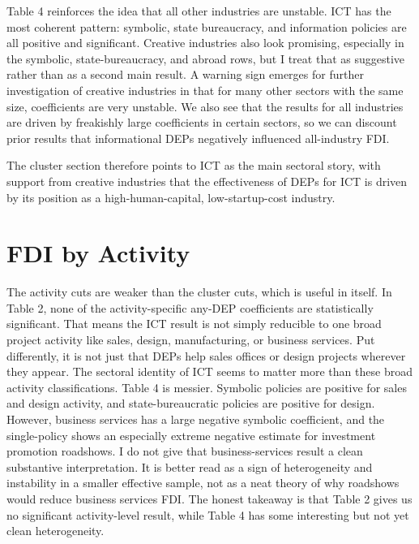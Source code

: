 \documentclass[doublespace,nopageskip]{UVAthesis}
\begin{document}
Table 4 reinforces the idea that all other industries are unstable. ICT has the most coherent pattern: symbolic, state bureaucracy, and information policies are all positive and significant. Creative industries also look promising, especially in the symbolic, state-bureaucracy, and abroad rows, but I treat that as suggestive rather than as a second main result. A warning sign emerges for further investigation of creative industries in that for many other sectors with the same size, coefficients are very unstable. We also see that the results for all industries are driven by freakishly large coefficients in certain sectors, so we can discount prior results that informational DEPs negatively influenced all-industry FDI.

The cluster section therefore points to ICT as the main sectoral story, with support from creative industries that the effectiveness of DEPs for ICT is driven by its position as a high-human-capital, low-startup-cost industry.

\FloatBarrier
\section{FDI by Activity} \label{ss:activity}





The activity cuts are weaker than the cluster cuts, which is useful in itself. In Table 2, none of the activity-specific any-DEP coefficients are statistically significant. That means the ICT result is not simply reducible to one broad project activity like sales, design, manufacturing, or business services. Put differently, it is not just that DEPs help sales offices or design projects wherever they appear. The sectoral identity of ICT seems to matter more than these broad activity classifications. Table 4 is messier. Symbolic policies are positive for sales and design activity, and state-bureaucratic policies are positive for design. However, business services has a large negative symbolic coefficient, and the single-policy shows an especially extreme negative estimate for investment promotion roadshows. I do not give that business-services result a clean substantive interpretation. It is better read as a sign of heterogeneity and instability in a smaller effective sample, not as a neat theory of why roadshows would reduce business services FDI. The honest takeaway is that Table 2 gives us no significant activity-level result, while Table 4 has some interesting but not yet clean heterogeneity.
\end{document}
